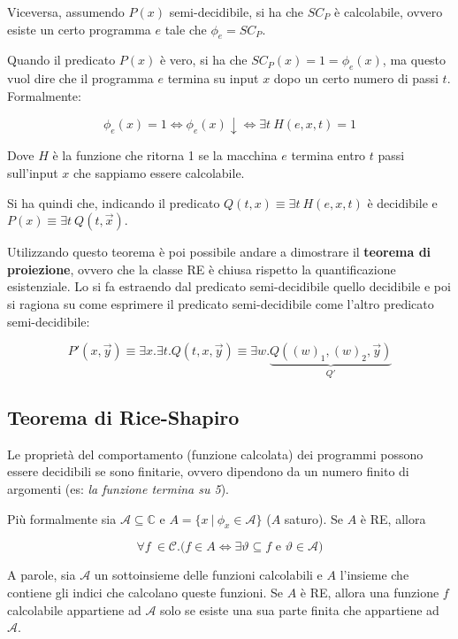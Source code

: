 Viceversa, assumendo $P(x)$ semi-decidibile, si ha che $SC_P$ è calcolabile, ovvero esiste un certo programma $e$ tale che $\phi_e = SC_P$.

Quando il predicato $P(x)$ è vero, si ha che $SC_P(x) = 1 = \phi_e(x)$, ma questo vuol dire che il programma $e$ termina su input $x$ dopo un certo numero di passi $t$. Formalmente:

$$
\phi_e(x) = 1 \Leftrightarrow \phi_e(x) \downarrow \Leftrightarrow \exists t \: H(e,x,t) = 1
$$

Dove $H$ è la funzione che ritorna 1 se la macchina $e$ termina entro $t$ passi sull'input $x$ che sappiamo essere calcolabile.

Si ha quindi che, indicando il predicato $Q(t,x) \equiv \exists t \: H(e,x,t)$ è decidibile e $P(x) \equiv \exists t \: Q(t,\vec{x})$.

Utilizzando questo teorema è poi possibile andare a dimostrare il \textbf{teorema di proiezione}, ovvero che la classe RE è chiusa rispetto la quantificazione esistenziale. Lo si fa estraendo dal predicato semi-decidibile quello decidibile e poi si ragiona su come esprimere il predicato semi-decidibile come l'altro predicato semi-decidibile:

 $$
 P'(x,\vec{y}) \equiv \exists x.\exists t . Q(t,x, \vec{y}) \equiv \exists w . \underbrace{Q((w)_1, (w)_2, \vec{y})}_{Q'}
 $$



\subsection{Teorema di Rice-Shapiro}

Le proprietà del comportamento (funzione calcolata) dei programmi possono essere decidibili se sono finitarie, ovvero dipendono da un numero finito di argomenti (es: \textit{la funzione termina su 5}).

Più formalmente sia $\mathcal{A}\subseteq \mathbb{C}$ e $A = \{x \: | \: \phi_x \in \mathcal{A} \}$ ($A$ saturo). Se $A$ è RE, allora

$$
\forall f \: \in \mathcal{C} . \bigg( f \in A \Leftrightarrow \exists \vartheta \subseteq f \text{ e } \vartheta \in \mathcal{A}  \bigg)
$$

A parole, sia $\mathcal{A}$ un sottoinsieme delle funzioni calcolabili e $A$ l'insieme che contiene gli indici che calcolano queste funzioni. Se $A$ è RE, allora una funzione $f$ calcolabile appartiene ad $\mathcal{A}$ solo se esiste una sua parte finita che appartiene ad $\mathcal{A}$.

